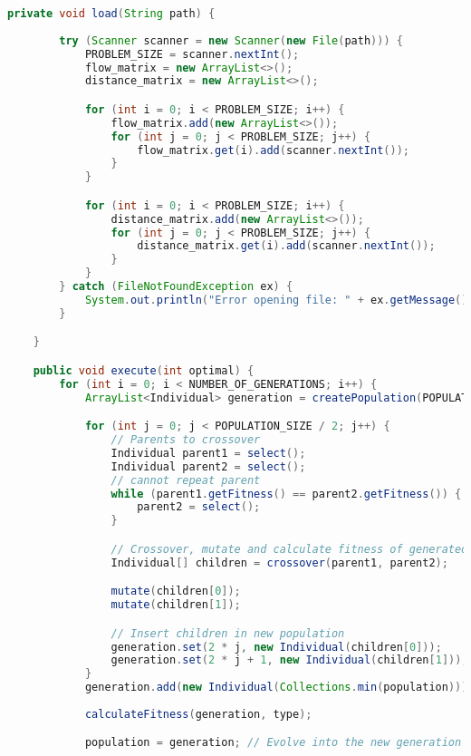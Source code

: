 \begin{lstlisting}[language=java,caption={Genetic.java},captionpos=b]
    private void load(String path) {
        
        try (Scanner scanner = new Scanner(new File(path))) {
            PROBLEM_SIZE = scanner.nextInt();
            flow_matrix = new ArrayList<>();
            distance_matrix = new ArrayList<>();

            for (int i = 0; i < PROBLEM_SIZE; i++) {
                flow_matrix.add(new ArrayList<>());
                for (int j = 0; j < PROBLEM_SIZE; j++) {
                    flow_matrix.get(i).add(scanner.nextInt());
                }
            }

            for (int i = 0; i < PROBLEM_SIZE; i++) {
                distance_matrix.add(new ArrayList<>());
                for (int j = 0; j < PROBLEM_SIZE; j++) {
                    distance_matrix.get(i).add(scanner.nextInt());
                }
            }
        } catch (FileNotFoundException ex) {
            System.out.println("Error opening file: " + ex.getMessage());
        }

    }

    public void execute(int optimal) {
        for (int i = 0; i < NUMBER_OF_GENERATIONS; i++) {
            ArrayList<Individual> generation = createPopulation(POPULATION_SIZE);

            for (int j = 0; j < POPULATION_SIZE / 2; j++) {
                // Parents to crossover
                Individual parent1 = select();
                Individual parent2 = select();
                // cannot repeat parent
                while (parent1.getFitness() == parent2.getFitness()) {
                    parent2 = select();
                } 

                // Crossover, mutate and calculate fitness of generated children
                Individual[] children = crossover(parent1, parent2);

                mutate(children[0]);
                mutate(children[1]);

                // Insert children in new population
                generation.set(2 * j, new Individual(children[0]));
                generation.set(2 * j + 1, new Individual(children[1]));
            }
            generation.add(new Individual(Collections.min(population))); // preserve best individual
            
            calculateFitness(generation, type);

            population = generation; // Evolve into the new generation
            

\end{lstlisting}
